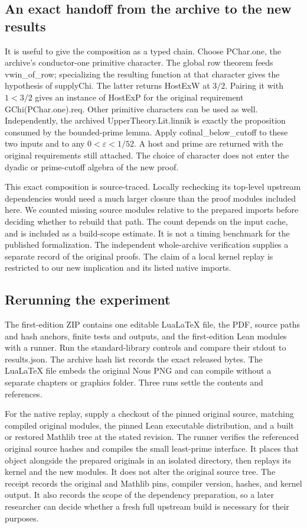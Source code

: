 \documentclass[12pt,letterpaper]{article}
\DeclareRobustCommand{\id}[1]{\mbox{\small\ttfamily #1}}
\begin{document}
\subsection{An exact handoff from the archive to the new results}

It is useful to give the composition as a typed chain. Choose \id{PChar.one}, the archive's conductor-one primitive character. The global row theorem feeds \id{vwin\_of\_row}; specializing the resulting function at that character gives the hypothesis of \id{supplyChi}. The latter returns \id{HostExW} at \(3/2\). Pairing it with \(1<3/2\) gives an instance of \id{HostExP} for the original requirement \id{GChi(PChar.one).req}. Other primitive characters can be used as well. Independently, the archived \id{UpperTheory.Lit.linnik} is exactly the proposition consumed by the bounded-prime lemma. Apply \id{cofinal\_below\_cutoff} to these two inputs and to any \(0<\varepsilon<1/52\). A host and prime are returned with the original requirements still attached. The choice of character does not enter the dyadic or prime-cutoff algebra of the new proof.

This exact composition is source-traced. Locally rechecking its top-level upstream dependencies would need a much larger closure than the proof modules included here. We counted missing source modules relative to the prepared imports before deciding whether to rebuild that path. The count depends on the input cache, and is included as a build-scope estimate. It is not a timing benchmark for the published formalization. The independent whole-archive verification supplies a separate record of the original proofs. The claim of a local kernel replay is restricted to our new implication and its listed native imports.

\subsection{Rerunning the experiment}

The first-edition ZIP contains one editable LuaLaTeX file, the PDF, source paths and hash anchors, finite tests and outputs, and the first-edition Lean modules with a runner. Run the standard-library controls and compare their stdout to \id{results.json}. The archive hash list records the exact released bytes. The LuaLaTeX file embeds the original Nous PNG and can compile without a separate chapters or graphics folder. Three runs settle the contents and references.

For the native replay, supply a checkout of the pinned original source, matching compiled original modules, the pinned Lean executable distribution, and a built or restored Mathlib tree at the stated revision. The runner verifies the referenced original source hashes and compiles the small least-prime interface. It places that object alongside the prepared originals in an isolated directory, then replays its kernel and the new modules. It does not alter the original source tree. The receipt records the original and Mathlib pins, compiler version, hashes, and kernel output. It also records the scope of the dependency preparation, so a later researcher can decide whether a fresh full upstream build is necessary for their purposes.
\end{document}
